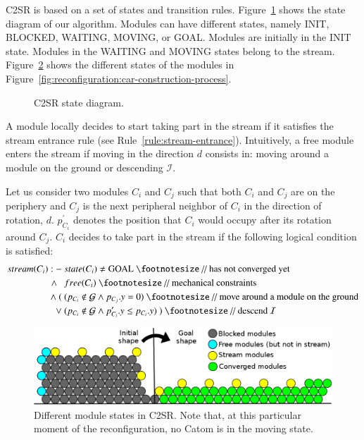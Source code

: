 C2SR is based on a set of states and transition rules. Figure~\ref{fig:reconfiguration:c2sr-state-diagram} shows the state diagram of our algorithm. Modules can have different states, namely INIT, BLOCKED, WAITING, MOVING, or GOAL. Modules are initially in the INIT state. Modules in the WAITING and MOVING states belong to the stream. Figure~\ref{fig:reconfiguration:c2sr-state-example} shows the different states of the modules in Figure~\ref{fig:reconfiguration:car-construction-process}.

\begin{figure}[!h]
	\centering
	
	\caption{C2SR state diagram.\label{fig:reconfiguration:c2sr-state-diagram}}
\end{figure}

A module locally decides to start taking part in the stream if it satisfies the stream entrance rule (see Rule~\ref{rule:stream-entrance}). Intuitively, a free module enters the stream if moving in the direction $d$ consists in: moving around a module on the ground or descending $\mathcal{I}$.

\begin{myRule}
	\label{rule:stream-entrance}
	Let us consider two modules $C_i$ and $C_j$ such that both $C_i$ and $C_j$ are on the periphery and $C_j$ is the next peripheral neighbor of $C_i$ in the direction of rotation, $d$. $p^{\prime}_{C_i}$ denotes the position that $C_i$ would occupy after its rotation around $C_j$. $C_i$ decides to take part in the stream if the following logical condition is satisfied:
	\begin{align*}
		stream(C_i) :-\ & state(C_i) \neq \text{GOAL} \ \text{\footnotesize // has not converged yet}\\
		\land\ \ \ & free(C_i)\ \text{\footnotesize // mechanical constraints}\\
		\land\ (\ & (p_{C_i} \notin \mathcal{G} \land p_{C_j}.y = 0)\ \text{\footnotesize // move around a module on the ground} \\
		\lor\ & (p_{C_i} \notin \mathcal{G} \land p^{\prime}_{C_i}.y \leq p_{C_i}.y)\ )\ \text{\footnotesize // descend $\mathcal{I}$}\\
	\end{align*}
\end{myRule}

\begin{figure}
	\centering
	\includegraphics[width=0.7\linewidth]{images/reconfiguration/stream-entrance}
	\caption{Different module states in C2SR. Note that, at this particular moment of the reconfiguration, no Catom is in the moving state.}
	\label{fig:reconfiguration:c2sr-state-example}
\end{figure}

